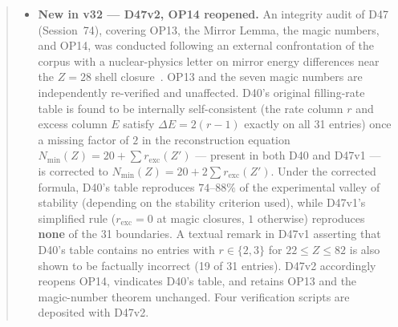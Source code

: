 \documentclass[11pt,a4paper]{article}
\theoremstyle{plain}
\theoremstyle{definition}
\theoremstyle{remark}
\begin{document}
\begin{abstract}
\begin{itemize}
\item \textbf{New in v32 --- D47v2, OP14 reopened.} An integrity audit of D47 (Session~74), covering OP13, the Mirror Lemma, the magic numbers, and OP14, was conducted following an external confrontation of the corpus with a nuclear-physics letter on mirror energy differences near the $Z=28$ shell closure~\cite{Escudeiro2026,Pigliapoco2026}. OP13 and the seven magic numbers are independently re-verified and unaffected. D40's original filling-rate table is found to be internally self-consistent (the rate column $r$ and excess column $E$ satisfy $\Delta E = 2(r-1)$ exactly on all 31 entries) once a missing factor of $2$ in the reconstruction equation $N_{\min}(Z)=20+\sum r_{\mathrm{exc}}(Z')$ --- present in both D40 and D47v1 --- is corrected to $N_{\min}(Z)=20+2\sum r_{\mathrm{exc}}(Z')$. Under the corrected formula, D40's table reproduces $74$--$88\%$ of the experimental valley of stability (depending on the stability criterion used), while D47v1's simplified rule ($r_{\mathrm{exc}}=0$ at magic closures, $1$ otherwise) reproduces \textbf{none} of the 31 boundaries. A textual remark in D47v1 asserting that D40's table contains no entries with $r\in\{2,3\}$ for $22\le Z\le82$ is also shown to be factually incorrect (19 of 31 entries). D47v2 accordingly reopens OP14, vindicates D40's table, and retains OP13 and the magic-number theorem unchanged. Four verification scripts are deposited with D47v2.


\end{itemize}
\end{abstract}
\end{document}
